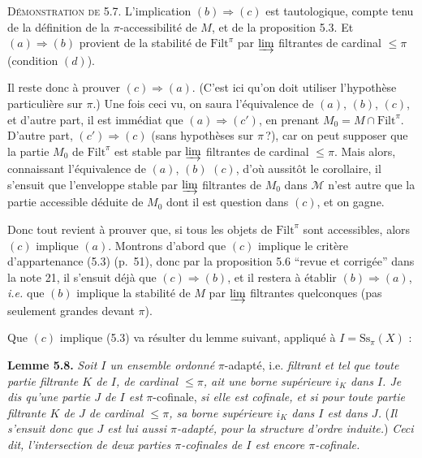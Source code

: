 \documentclass[11pt]{article}
\newcommand{\printedpage}[1]{\marginpar{\raggedright\footnotesize p.~#1}}
\newcommand{\msp}[1]{\marginpar{\raggedright\footnotesize [#1]}}
\newcommand{\Filt}{\mathrm{Filt}}
\newcommand{\Ss}{\mathrm{Ss}}
\newcommand{\M}{\mathcal{M}}
\begin{document}
\textsc{Démonstration de} 5.7. L'implication $(b) \Longrightarrow (c)$ est tautologique, compte tenu de la définition de la $\pi$-accessibilité de $M$, et de la proposition 5.3. Et $(a) \Longrightarrow (b)$ provient de la stabilité de $\Filt^\pi$ par $\varinjlim$ filtrantes de cardinal $\leq \pi$ (condition $(d)$).

Il reste donc à prouver $(c) \Longrightarrow (a)$. (C'est ici qu'on doit utiliser l'hypothèse particulière sur $\pi$.) Une fois ceci vu, on saura l'équivalence de $(a)$, $(b)$, $(c)$, et d'autre part, il est immédiat que $(a) \Longrightarrow (c')$, en
\msp{page 59}
prenant $M_0 = M \cap \Filt^\pi$. D'autre part, $(c') \Longrightarrow (c)$ (sans hypothèses sur $\pi\,$?), car on peut supposer que la partie $M_0$ de $\Filt^\pi$ est stable par $\varinjlim$ filtrantes de cardinal $\leq \pi$. Mais alors, connaissant l'équivalence de $(a)$, $(b)$ $(c)$, d'où aussitôt le corollaire, il s'ensuit que l'enveloppe stable par $\varinjlim$ filtrantes de $M_0$ dans $\M$ n'est autre que la partie accessible déduite de $M_0$ dont il est question dans $(c)$, et on gagne. %

Donc tout revient à prouver que, si tous les objets de $\Filt^\pi$ sont accessibles, alors $(c)$ implique $(a)$. Montrons d'abord que $(c)$ implique le critère d'appartenance (5.3) (p.~51), donc par la proposition 5.6 “revue et corrigée” dans la note 21, il s'ensuit déjà que $(c) \Longrightarrow (b)$, et il restera à établir $(b) \Longrightarrow (a)$, \textit{i.e.} que $(b)$ implique la stabilité de $M$ par $\varinjlim$ filtrantes quelconques (pas seulement grandes devant $\pi$).

Que $(c)$ implique (5.3) va résulter du lemme suivant, appliqué à $I = \Ss_\pi(X)$ :

\textbf{Lemme 5.8.} \textit{Soit $I$ un ensemble ordonné} $\pi$-adapté, i.e. \textit{filtrant et tel que toute partie filtrante $K$ de $I$, de cardinal $\leq \pi$, ait une borne supérieure $i_K$ dans $I$. Je dis qu'une partie $J$ de $I$ est} $\pi$-cofinale, \textit{si elle est cofinale, et si pour toute partie filtrante $K$ de $J$ de cardinal $\leq \pi$, sa borne supérieure $i_K$ dans $I$ est}
\printedpage{36}
\msp{page 60}
\textit{dans $J$.} (\textit{Il s'ensuit donc que $J$ est lui aussi $\pi$-adapté, pour la structure d'ordre induite.}) \textit{Ceci dit, l'intersection de deux parties $\pi$-cofinales de $I$ est encore $\pi$-cofinale.}
\end{document}
